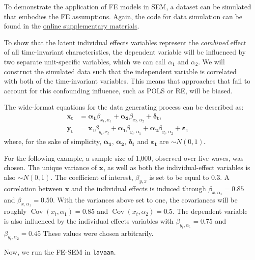 \documentclass[]{interact}
\theoremstyle{plain}%
\theoremstyle{definition}
\theoremstyle{remark}
\begin{document}
\singlespacing

\doublespacing

To demonstrate the application of FE models in SEM, a dataset can be
simulated that embodies the FE assumptions. Again, the code for data
simulation can be found in the
\href{https://github.com/henrik-andersen/FE-SEM/blob/master/simulation-code.R}{online
supplementary materials}.

To show that the latent individual effects variables represent the
\emph{combined} effect of all time-invariant characteristics, the
dependent variable will be influenced by two separate unit-specific
variables, which we can call \(\alpha_{1}\) and \(\alpha_{2}\). We will
construct the simulated data such that the independent variable is
correlated with both of the time-invariant variables. This means that
approaches that fail to account for this confounding influence, such as
POLS or RE, will be biased.

The wide-format equations for the data generating process can be
described as: \begin{align}
\bm{x_{t}} & = \bm{\alpha_{1}}\beta_{x_{t},\alpha_{1}} + \bm{\alpha_{2}}\beta_{x_{t},\alpha_{2}} + \bm{\delta_{t}}, \\
\bm{y_{t}} & = \bm{x_{t}}\beta_{y_{t},x_{t}} + \bm{\alpha_{1}}\beta_{y_{t},\alpha_{1}} + \bm{\alpha_{2}} \beta_{y_{t},\alpha_{2}} + \bm{\varepsilon_{t}} 
\end{align} where, for the sake of simplicity, \(\bm{\alpha_{1}}\),
\(\bm{\alpha_{2}}\), \(\bm{\delta_{t}}\) and \(\bm{\varepsilon_{t}}\)
are \(\sim N(0,1)\).

For the following example, a sample size of 1,000, observed over five
waves, was chosen. The unique variance of \(\bm{x}\), as well as both
the individual-effect variables is also \(\sim N(0,1)\). The coefficient
of interest, \(\beta_{y,x}\) is set to be equal to \(0.3\). A
correlation between \(\bm{x}\) and the individual effects is induced
through \(\beta_{x,\alpha_{1}} = 0.85\) and
\(\beta_{x,\alpha_{1}} = 0.50\). With the variances above set to one,
the covariances will be roughly
\(\mathop{\mathrm{\mathrm{Cov}}}(x_{t},\alpha_{1}) = 0.85\) and
\(\mathop{\mathrm{\mathrm{Cov}}}(x_{t},\alpha_{2}) = 0.5\). The
dependent variable is also influenced by the individual effects
variables with \(\beta_{y_{t},\alpha_{1}} = 0.75\) and
\(\beta_{y_{t},\alpha_{2}} = 0.45\) These values were chosen
arbitrarily.

Now, we run the FE-SEM in \texttt{lavaan}.
\end{document}
